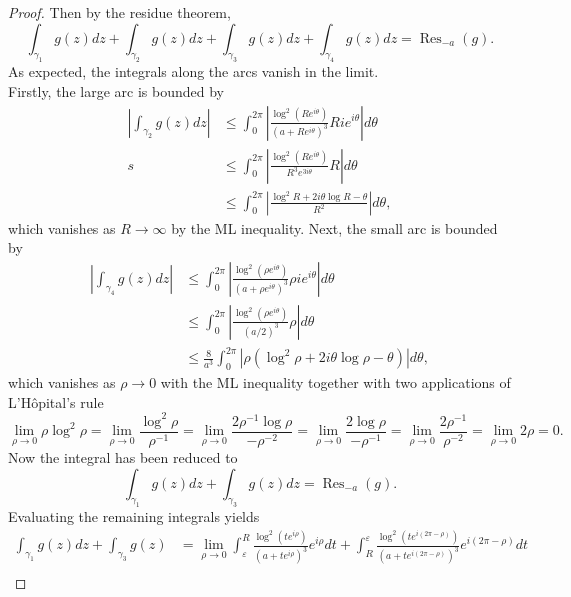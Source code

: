 \documentclass{article}
\begin{document}
\begin{proof}
  Then by the residue theorem, \[
    \int_{\gamma_1} g(z) dz + \int_{\gamma_2} g(z) dz + \int_{\gamma_3} g(z) dz + \int_{\gamma_4} g(z) dz
    = \operatorname{Res}_{-a}(g).
  \]
  As expected, the integrals along the arcs vanish in the limit.
  \\
  Firstly, the large arc is bounded by \begin{align*}
    \left|
      \int_{\gamma_2} g(z) dz
    \right|
    &\leq \int_0^{2\pi} \left|
      \frac{\log^2(Re^{i\theta})}{(a + Re^{i\theta})^3}Rie^{i\theta}
    \right| d\theta \\s
    &\leq \int_0^{2\pi} \left|
      \frac{\log^2(Re^{i\theta})}{R^3e^{3i\theta}}R
    \right| d\theta \\
    &\leq \int_0^{2\pi} \left|
      \frac{\log^2 R + 2i\theta\log R - \theta}{R^2}
    \right| d\theta,
  \end{align*} which vanishes as $R \rightarrow \infty$ by the ML inequality.
  Next, the small arc is bounded by \begin{align*}
    \left|
      \int_{\gamma_4} g(z) dz
    \right|
    &\leq \int_0^{2\pi} \left|
      \frac{\log^2(\rho e^{i\theta})}{(a + \rho e^{i\theta})^3}\rho ie^{i\theta}
    \right| d\theta \\
    &\leq \int_0^{2\pi} \left|
      \frac{\log^2(\rho e^{i\theta})}{(a/2)^3}\rho
    \right| d\theta \\
    &\leq \frac{8}{a^3}\int_0^{2\pi} \left|
      \rho(\log^2\rho + 2i\theta\log\rho - \theta)
    \right| d\theta,
  \end{align*} which vanishes as $\rho \rightarrow 0$ with the ML inequality
  together with two applications of L'H\^opital's rule \[
    \lim_{\rho \rightarrow 0} \rho\log^2 \rho
    = \lim_{\rho \rightarrow 0} \frac{\log^2 \rho}{\rho^{-1}}
    = \lim_{\rho \rightarrow 0} \frac{2\rho^{-1}\log \rho}{-\rho^{-2}}
    = \lim_{\rho \rightarrow 0} \frac{2\log \rho}{-\rho^{-1}}
    = \lim_{\rho \rightarrow 0} \frac{2\rho^{-1}}{\rho^{-2}}
    = \lim_{\rho \rightarrow 0} 2\rho
    = 0.
  \]
  Now the integral has been reduced to \[
    \int_{\gamma_1} g(z) dz + \int_{\gamma_3} g(z) dz = \operatorname{Res}_{-a}(g).
  \]
  Evaluating the remaining integrals yields \begin{align*}
    \int_{\gamma_1} g(z) dz + \int_{\gamma_3} g(z)
    &=
    \lim_{\rho \rightarrow 0}
    \int_\varepsilon^R \frac{\log^2(te^{i\rho})}{(a + te^{i\rho})^3}e^{i\rho}dt +
    \int_R^\varepsilon \frac{\log^2(te^{i(2\pi-\rho)})}{(a + te^{i(2\pi-\rho)})^3}e^{i(2\pi-\rho)}dt \\

\end{align*}
\end{proof}
\end{document}
